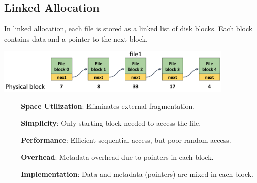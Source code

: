 \documentclass[../../compsys.tex]{subfiles}
\begin{document}
\subsection{Linked Allocation}
In linked allocation, each file is stored as a linked list of disk blocks. Each block contains data and a pointer to the next block.
\begin{center}
  \includegraphics[width=0.85\textwidth]{chapters/L6/images/linked.png}
\end{center}
\begin{itemize}[itemsep=2pt, topsep=1pt]
    \item[-] \textbf{Space Utilization}: Eliminates external fragmentation.
    \item[-] \textbf{Simplicity}: Only starting block needed to access the file.
    \item[-] \textbf{Performance}: Efficient sequential access, but poor random access.
    \item[-] \textbf{Overhead}: Metadata overhead due to pointers in each block.
    \item[-] \textbf{Implementation}: Data and metadata (pointers) are mixed in each block.
\end{itemize}

\newpage
\end{document}
